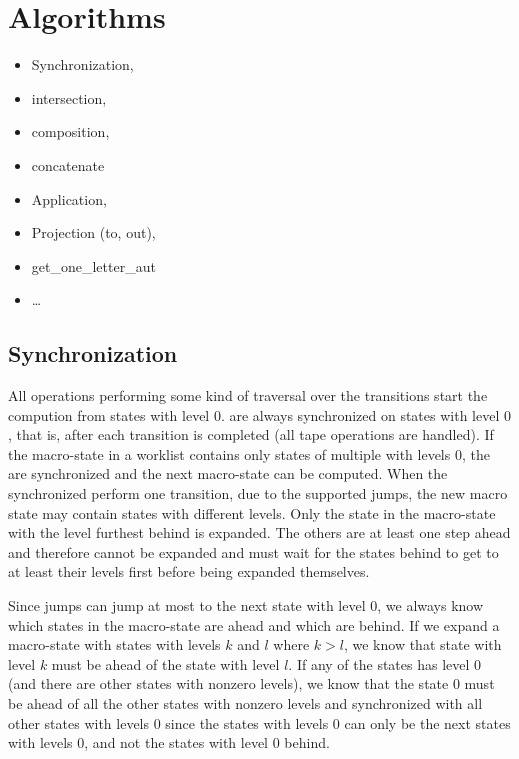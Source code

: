 \section{Algorithms}
\label{sec:Algorithms}

\begin{itemize}
  \item Synchronization,
  \item intersection,
  \item composition,
  \item concatenate
  \item Application,
  \item Projection (to, out),
  \item get\_one\_letter\_aut
  \item \ldots
\end{itemize}

\subsection{Synchronization}

All operations performing some kind of traversal over the transitions start the compution from states with level $0$.
\nfts are always synchronized on states with level $0$, that is, after each \nft transition is completed (all tape operations are handled).
If the macro-state in a worklist contains only states of multiple \nfts with levels $0$, the \nfts are synchronized and the next macro-state can be computed.
When the synchronized \nfts perform one transition, due to the supported jumps, the new macro state may contain states with different levels.
Only the state in the macro-state with the level furthest behind is expanded.
The others are at least one step ahead and therefore cannot be expanded and must wait for the states behind to get to at least their levels first before being expanded themselves.

Since jumps can jump at most to the next state with level $0$, we always know which states in the macro-state are ahead and which are behind.
If we expand a macro-state with states with levels $k$ and $l$ where $k > l$, we know that state with level $k$ must be ahead of the state with level $l$.
If any of the states has level $0$ (and there are other states with nonzero levels), we know that the state $0$ must be ahead of all the other states with nonzero levels and synchronized with all other states with levels $0$ since the states with levels $0$ can only be the next states with levels $0$, and not the states with level $0$ behind.


